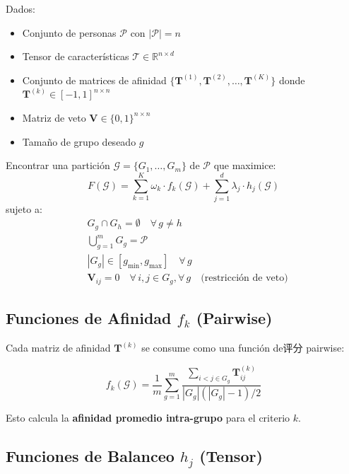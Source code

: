 \documentclass[12pt,a4paper]{article}
\begin{document}
\begin{definitionbox}
Dados:
\begin{itemize}
    \item Conjunto de personas $\mathcal{P}$ con $|\mathcal{P}| = n$
    \item Tensor de características $\boldsymbol{\mathcal{T}} \in \mathbb{R}^{n \times d}$
    \item Conjunto de matrices de afinidad $\{\mathbf{T}^{(1)}, \mathbf{T}^{(2)}, \ldots, \mathbf{T}^{(K)}\}$ donde $\mathbf{T}^{(k)} \in [-1,1]^{n \times n}$
    \item Matriz de veto $\mathbf{V} \in \{0,1\}^{n \times n}$
    \item Tamaño de grupo deseado $g$
\end{itemize}

Encontrar una partición $\mathcal{G} = \{G_1, \ldots, G_m\}$ de $\mathcal{P}$ que maximice:
\[
F(\mathcal{G}) = \sum_{k=1}^{K} \omega_k \cdot f_k(\mathcal{G}) + \sum_{j=1}^{d} \lambda_j \cdot h_j(\mathcal{G})
\]
sujeto a:
\begin{align}
    & G_g \cap G_h = \emptyset \quad \forall\, g \neq h \\
    & \bigcup_{g=1}^{m} G_g = \mathcal{P} \\
    & |G_g| \in [g_{\min}, g_{\max}] \quad \forall\, g \\
    & \mathbf{V}_{ij} = 0 \quad \forall\, i, j \in G_g, \forall\, g \quad \text{(restricción de veto)}
\end{align}
\end{definitionbox}

\subsection{Funciones de Afinidad $f_k$ (Pairwise)}

Cada matriz de afinidad $\mathbf{T}^{(k)}$ se consume como una función de评分 pairwise:

\[
f_k(\mathcal{G}) = \frac{1}{m} \sum_{g=1}^{m} \frac{\sum_{i < j \in G_g} \mathbf{T}^{(k)}_{ij}}{|G_g|(|G_g|-1)/2}
\]

Esto calcula la \textbf{afinidad promedio intra-grupo} para el criterio $k$.

\subsection{Funciones de Balanceo $h_j$ (Tensor)}
\end{document}
